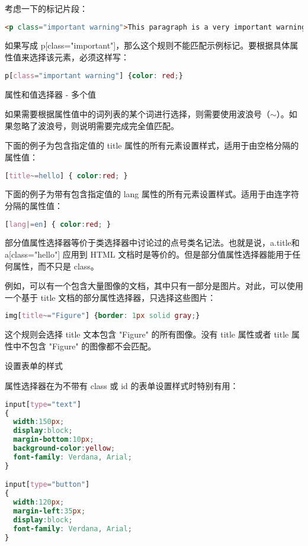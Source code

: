 \begin{compactitem}
考虑一下的标记片段：

\begin{lstlisting}[language=HTML]
<p class="important warning">This paragraph is a very important warning.</p>
\end{lstlisting}

如果写成 p[class="important"]，那么这个规则不能匹配示例标记。要根据具体属性值来选择该元素，必须这样写：

\begin{lstlisting}[language=CSS]
p[class="important warning"] {color: red;}
\end{lstlisting}



\item 属性和值选择器 - 多个值


如果需要根据属性值中的词列表的某个词进行选择，则需要使用波浪号（$\sim$）。如果忽略了波浪号，则说明需要完成完全值匹配。

下面的例子为包含指定值的 title 属性的所有元素设置样式，适用于由空格分隔的属性值：

\begin{lstlisting}[language=CSS]
[title~=hello] { color:red; }
\end{lstlisting}

下面的例子为带有包含指定值的 lang 属性的所有元素设置样式。适用于由连字符分隔的属性值：

\begin{lstlisting}[language=CSS]
[lang|=en] { color:red; }
\end{lstlisting}

部分值属性选择器等价于类选择器中讨论过的点号类名记法。也就是说，a.title和 a[class="hello"] 应用到 HTML 文档时是等价的。但是部分值属性选择器能用于任何属性，而不只是 class。

例如，可以有一个包含大量图像的文档，其中只有一部分是图片。对此，可以使用一个基于 title 文档的部分属性选择器，只选择这些图片：

\begin{lstlisting}[language=CSS]
img[title~="Figure"] {border: 1px solid gray;}
\end{lstlisting}

这个规则会选择 title 文本包含 "Figure" 的所有图像。没有 title 属性或者 title 属性中不包含 "Figure" 的图像都不会匹配。


\item 设置表单的样式

属性选择器在为不带有 class 或 id 的表单设置样式时特别有用：

\begin{lstlisting}[language=CSS]
input[type="text"]
{
  width:150px;
  display:block;
  margin-bottom:10px;
  background-color:yellow;
  font-family: Verdana, Arial;
}

input[type="button"]
{
  width:120px;
  margin-left:35px;
  display:block;
  font-family: Verdana, Arial;
}
\end{lstlisting}

\end{compactitem}


